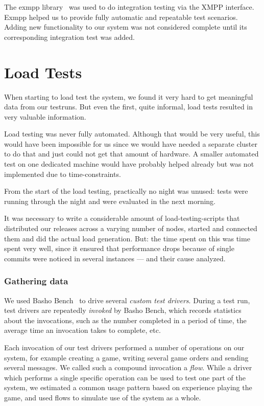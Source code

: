 \documentclass[11pt,a4paper]{report}
\begin{document}
The exmpp library~\cite{exmpp} was used to do integration testing via the XMPP
interface. Exmpp helped us to provide fully automatic and repeatable test
scenarios. Adding new functionality to our system was not considered complete
until its corresponding integration test was added.

\section{Load Tests}\label{load_tests}
When starting to load test the system,
we found it very hard to get meaningful data from our testruns.
But even the first, quite informal, load tests resulted in very valuable information.

Load testing was never fully automated. Although that would be very useful,
this would have been impossible for us since we would have needed a separate
cluster to do that and just could not get that amount of hardware.
A smaller automated test on one dedicated machine would have probably helped
already but was not implemented due to time-constraints.

From the start of the load testing, practically no night was unused: tests were
running through the night and were evaluated in the next morning.

It was necessary to write a considerable amount of load-testing-scripts that
distributed our releases across a varying number of nodes, started and connected
them and did the actual load generation. But: the time spent on this was time
spent very well, since it ensured that performance drops because of single
commits were noticed in several instances --- and their cause analyzed.

\subsubsection{Gathering data}
We used Basho Bench~\cite{bashobench}\cite{bashobench_github} to drive several \emph{custom test drivers}.
During a test run, test drivers are repeatedly \emph{invoked} by Basho Bench,
which records statistics about the invocations, such as the number completed in
a period of time, the average time an invocation takes to complete, etc.

Each invocation of our test drivers performed a number of operations on our system,
for example creating a game, writing several game orders and sending several
messages. We called such a compound invocation a \emph{flow}. While a driver
which performs a single specific operation can be used to test one part of the
system, we estimated a common usage pattern based on experience playing the game,
and used flows to simulate use of the system as a whole.
\end{document}
